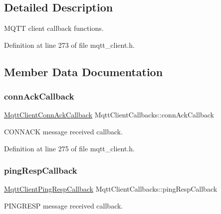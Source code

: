 \subsection{Detailed Description}
M\+Q\+TT client callback functions. 

Definition at line 273 of file mqtt\+\_\+client.\+h.



\subsection{Member Data Documentation}
\mbox{\label{structMqttClientCallbacks_aed5ae5936c4f84ee5ef14316b0bbcd84}} 
\subsubsection{\texorpdfstring{conn\+Ack\+Callback}{connAckCallback}}
{\footnotesize\ttfamily \hyperlink{mqtt__client_8h_a383a94b4f1e3508537ab73c3aba4d2e0}{Mqtt\+Client\+Conn\+Ack\+Callback} Mqtt\+Client\+Callbacks\+::conn\+Ack\+Callback}



C\+O\+N\+N\+A\+CK message received callback. 



Definition at line 275 of file mqtt\+\_\+client.\+h.

\mbox{\label{structMqttClientCallbacks_a93a3b81b444cc74fb5410d464b4ee87d}} 
\subsubsection{\texorpdfstring{ping\+Resp\+Callback}{pingRespCallback}}
{\footnotesize\ttfamily \hyperlink{mqtt__client_8h_a534e10d3702515c4a92131c419b92c61}{Mqtt\+Client\+Ping\+Resp\+Callback} Mqtt\+Client\+Callbacks\+::ping\+Resp\+Callback}



P\+I\+N\+G\+R\+E\+SP message received callback. 



